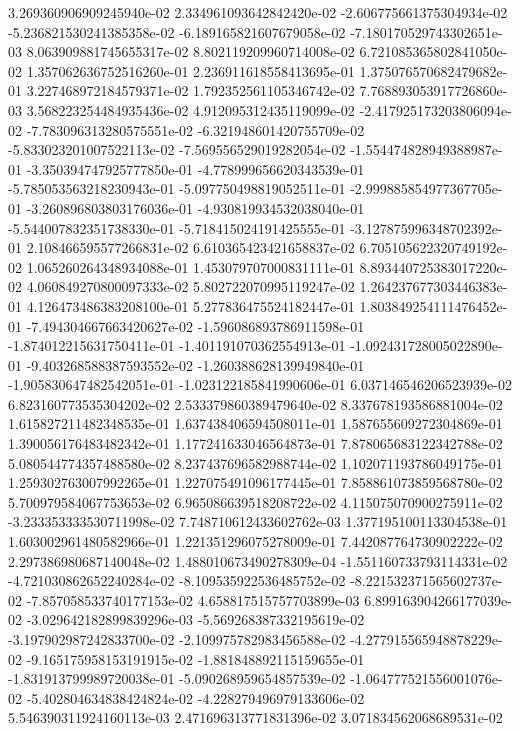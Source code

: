 3.269360906909245940e-02
2.334961093642842420e-02
-2.606775661375304934e-02
-5.236821530241385358e-02
-6.189165821607679058e-02
-7.180170529743302651e-03
8.063909881745655317e-02
8.802119209960714008e-02
6.721085365802841050e-02
1.357062636752516260e-01
2.236911618558413695e-01
1.375076570682479682e-01
3.227468972184579371e-02
1.792352561105346742e-02
7.768893053917726860e-03
3.568223254484935436e-02
4.912095312435119099e-02
-2.417925173203806094e-02
-7.783096313280575551e-02
-6.321948601420755709e-02
-5.833023201007522113e-02
-7.569556529019282054e-02
-1.554474828949388987e-01
-3.350394747925777850e-01
-4.778999656620343539e-01
-5.785053563218230943e-01
-5.097750498819052511e-01
-2.999885854977367705e-01
-3.260896803803176036e-01
-4.930819934532038040e-01
-5.544007832351738330e-01
-5.718415024191425555e-01
-3.127875996348702392e-01
2.108466595577266831e-02
6.610365423421658837e-02
6.705105622320749192e-02
1.065260264348934088e-01
1.453079707000831111e-01
8.893440725383017220e-02
4.060849270800097333e-02
5.802722070995119247e-02
1.264237677303446383e-01
4.126473486383208100e-01
5.277836475524182447e-01
1.803849254111476452e-01
-7.494304667663420627e-02
-1.596086893786911598e-01
-1.874012215631750411e-01
-1.401191070362554913e-01
-1.092431728005022890e-01
-9.403268588387593552e-02
-1.260388628139949840e-01
-1.905830647482542051e-01
-1.023122185841990606e-01
6.037146546206523939e-02
6.823160773535304202e-02
2.533379860389479640e-02
8.337678193586881004e-02
1.615827211482348535e-01
1.637438406594508011e-01
1.587655609272304869e-01
1.390056176483482342e-01
1.177241633046564873e-01
7.878065683122342788e-02
5.080544774357488580e-02
8.237437696582988744e-02
1.102071193786049175e-01
1.259302763007992265e-01
1.227075491096177445e-01
7.858861073859568780e-02
5.700979584067753653e-02
6.965086639518208722e-02
4.115075070900275911e-02
-3.233353333530711998e-02
7.748710612433602762e-03
1.377195100113304538e-01
1.603002961480582966e-01
1.221351296075278009e-01
7.442087764730902222e-02
2.297386980687140048e-02
1.488010673490278309e-04
-1.551160733793114331e-02
-4.721030862652240284e-02
-8.109535922536485752e-02
-8.221532371565602737e-02
-7.857058533740177153e-02
4.658817515757703899e-03
6.899163904266177039e-02
-3.029642182899839296e-03
-5.569268387332195619e-02
-3.197902987242833700e-02
-2.109975782983456588e-02
-4.277915565948878229e-02
-9.165175958153191915e-02
-1.881848892115159655e-01
-1.831913799989720038e-01
-5.090268959654857539e-02
-1.064777521556001076e-02
-5.402804634838424824e-02
-4.228279496979133606e-02
5.546390311924160113e-03
2.471696313771831396e-02
3.071834562068689531e-02
